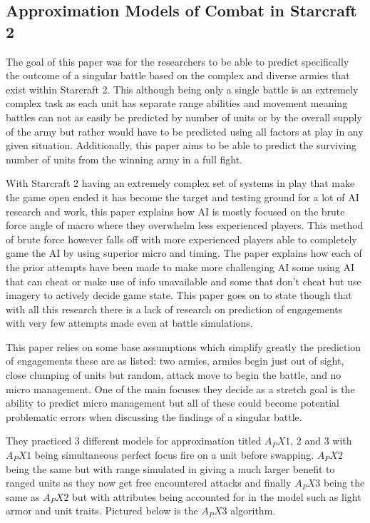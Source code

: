 \documentclass[a4paper,12pt]{report}
\begin{document}
\subsection{Approximation Models of Combat in Starcraft 2}

The goal of this paper was for the researchers to be able to predict specifically the outcome of a singular battle based on the complex and diverse armies that exist within Starcraft 2. This although being only a single battle is an extremely complex task as each unit has separate range abilities and movement meaning battles can not as easily be predicted by number of units or by the overall supply of the army but rather would have to be predicted using all factors at play in any given situation. Additionally, this paper aims to be able to predict the surviving number of units from the winning army in a full fight.

With Starcraft 2 having an extremely complex set of systems in play that make the game open ended it has become the target and testing ground for a lot of AI research and work, this paper explains how AI is mostly focused on the brute force angle of macro where they overwhelm less experienced players. This method of brute force however falls off with more experienced players able to completely game the AI by using superior micro and timing. The paper explains how each of the prior attempts have been made to make more challenging AI some using AI that can cheat or make use of info unavailable and some that don’t cheat but use imagery to actively decide game state. This paper goes on to state though that with all this research there is a lack of research on prediction of engagements with very few attempts made even at battle simulations.

This paper relies on some base assumptions which simplify greatly the prediction of engagements these are as listed: two armies, armies begin just out of sight, close clumping of units but random, attack move to begin the battle, and no micro management. One of the main focuses they decide as a stretch goal is the ability to predict micro management but all of these could become potential problematic errors when discussing the findings of a singular battle.

They practiced 3 different models for approximation titled $A_PX1$, 2 and 3 with $A_PX1$ being simultaneous perfect focus fire on a unit before swapping. $A_PX2$ being the same but with range simulated in giving a much larger benefit to ranged units as they now get free encountered attacks and finally $A_PX3$ being the same as $A_PX2$ but with attributes being accounted for in the model such as light armor and unit traits. Pictured below is the $A_PX3$ algorithm.
\end{document}
